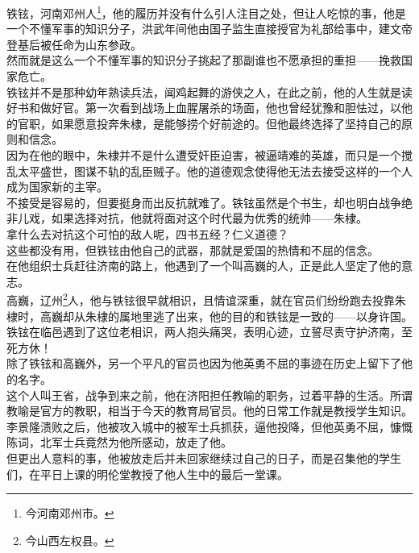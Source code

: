 \begin{multicols}{\theparacolNo}
铁铉，河南邓州人\footnote{今河南邓州市。}，他的履历并没有什么引人注目之处，但让人吃惊的事，他是一个不懂军事的知识分子，洪武年间他由国子监生直接授官为礼部给事中，建文帝登基后被任命为山东参政。\\

然而就是这么一个不懂军事的知识分子挑起了那副谁也不愿承担的重担——挽救国家危亡。\\

铁铉并不是那种幼年熟读兵法，闻鸡起舞的游侠之人，在此之前，他的人生就是读好书和做好官。第一次看到战场上血腥屠杀的场面，他也曾经犹豫和胆怯过，以他的官职，如果愿意投奔朱棣，是能够捞个好前途的。但他最终选择了坚持自己的原则和信念。\\

因为在他的眼中，朱棣并不是什么遭受奸臣迫害，被逼靖难的英雄，而只是一个搅乱太平盛世，图谋不轨的乱臣贼子。他的道德观念使得他无法去接受这样的一个人成为国家新的主宰。\\

不接受是容易的，但要挺身而出反抗就难了。铁铉虽然是个书生，却也明白战争绝非儿戏，如果选择对抗，他就将面对这个时代最为优秀的统帅——朱棣。\\

拿什么去对抗这个可怕的敌人呢，四书五经？仁义道德？\\

这些都没有用，但铁铉由他自己的武器，那就是爱国的热情和不屈的信念。\\

在他组织士兵赶往济南的路上，他遇到了一个叫高巍的人，正是此人坚定了他的意志。\\

高巍，辽州\footnote{今山西左权县。}人，他与铁铉很早就相识，且情谊深重，就在官员们纷纷跑去投靠朱棣时，高巍却从朱棣的属地里逃了出来，他的目的和铁铉是一致的——以身许国。\\

铁铉在临邑遇到了这位老相识，两人抱头痛哭，表明心迹，立誓尽责守护济南，至死方休！\\

除了铁铉和高巍外，另一个平凡的官员也因为他英勇不屈的事迹在历史上留下了他的名字。\\

这个人叫王省，战争到来之前，他在济阳担任教喻的职务，过着平静的生活。所谓教喻是官方的教职，相当于今天的教育局官员。他的日常工作就是教授学生知识。李景隆溃败之后，他被攻入城中的被军士兵抓获，逼他投降，但他英勇不屈，慷慨陈词，北军士兵竟然为他所感动，放走了他。\\

但更出人意料的事，他被放走后并未回家继续过自己的日子，而是召集他的学生们，在平日上课的明伦堂教授了他人生中的最后一堂课。\\


\end{multicols}
